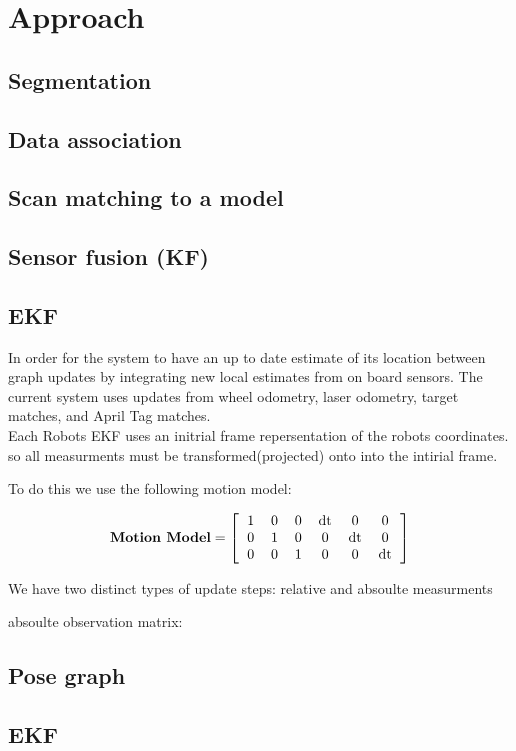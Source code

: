\section{Approach}
\subsection{Segmentation}
\subsection{Data association}
\subsection{Scan matching to a model}
\subsection{Sensor fusion (KF)}
\subsection{EKF}
In order for the system to have an up to date estimate of its location between graph updates by integrating new local estimates from on board sensors.  The current system uses updates from wheel odometry, laser odometry, target matches, and April Tag matches. \\  

Each Robots EKF uses an initrial frame repersentation of the robots coordinates. so all measurments must be transformed(projected) onto into the intirial  frame.


 To do this we use the following motion model:
 
 
 \[ \textbf{Motion Model} =  \left[ \begin{tabular}{cccccc} 1 & 0 & 0 & dt & 0  &  0\\
 																				0 & 1 & 0 & 0  & dt &  0\\
 																				0 & 0 & 1 & 0  & 0  &  dt\\  \end{tabular} \right] \]
 																				
 																	
We have two distinct types of update steps: relative and absoulte measurments

absoulte observation matrix:  

\subsection{Pose graph}



\subsection{EKF}
